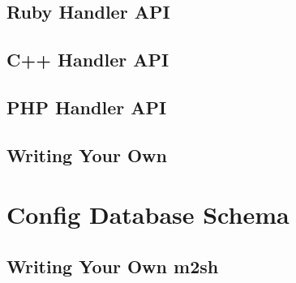 \subsection{Ruby Handler API}


\subsection{C++ Handler API}


\subsection{PHP Handler API}


\subsection{Writing Your Own}


\section{Config Database Schema}


\subsection{Writing Your Own m2sh}



